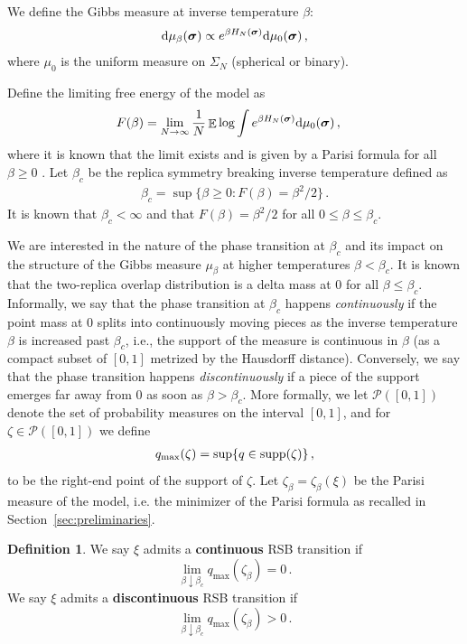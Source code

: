 \documentclass[11pt]{article}
\theoremstyle{definition}
\newtheorem{definition}{Definition}
\numberwithin{equation}{section}
\newcommand{\<}{\langle}
\renewcommand{\>}{\rangle}
\def\bsigma{{\boldsymbol{\sigma}}}
\def\bbE{{\mathbb{E}}}
\def\cP{{\mathcal{P}}}
\def\de{{\rm d}}
\DeclareMathOperator*{\E}{\bbE}
\def\supp{{\rm supp}}
\begin{document}
%
 We define the Gibbs measure at inverse temperature $\beta$:
\begin{align}\label{eq:Gibbs}
\de \mu_{\beta}(\bsigma) \propto e^{\beta H_N(\bsigma)} \de \mu_{0}(\bsigma)\,,
\end{align}
where $\mu_0$ is the uniform measure on $\Sigma_N$ (spherical or binary).

Define the limiting free energy of the model as
 \begin{align}
F(\beta) &= \lim_{N\to \infty} \frac{1}{N} \E \log \int e^{\beta H_N(\bsigma)} \de\mu_0( \bsigma)\,,
\end{align}
where it is known that the limit exists and is given by a Parisi formula for all $\beta \ge 0$ \cite{parisi1979infinite,talagrand2006parisi,talagrand2006spherical,panchenko2013parisi,chen2013aizenman}.
%
Let $\beta_c$ be the replica symmetry breaking inverse temperature defined as 
\begin{align}\label{eq:betac}
\beta_c = \sup\{\beta \ge 0 : F(\beta) = \beta^2/2\}\,.
\end{align}
It is known that $\beta_c<\infty$ and that $F(\beta)=\beta^2/2$ for all $0\leq\beta\leq\beta_c$.


We are interested in the nature of the phase transition at $\beta_c$ and its impact on the structure of the Gibbs measure $\mu_{\beta}$ at higher temperatures $\beta < \beta_c$. It is known that the two-replica overlap distribution is a delta mass at $0$ for all $\beta \le \beta_c$. Informally, we say that the phase transition at $\beta_c$ happens \emph{continuously} if the point mass at $0$ splits into continuously moving pieces as the inverse temperature $\beta$ is increased past $\beta_c$, i.e., the support of the measure is continuous in $\beta$ (as a compact subset of $[0,1]$ metrized by the Hausdorff distance). Conversely, we say that the phase transition happens \emph{discontinuously} if a piece of the support emerges far away from 0 as soon as $\beta>\beta_c$.  
More formally, we let $\cP([0,1])$ denote the set of probability measures on the interval $[0,1]$, and for $\zeta \in \cP([0,1])$ we define
\begin{align}
q_{\max}(\zeta)
=
\sup\{q\in \supp(\zeta)\}\,,
\end{align}
to be the right-end point of the support of $\zeta$.
Let $\zeta_{\beta}=\zeta_{\beta}(\xi)$ be the Parisi measure of the model, i.e. the minimizer of the Parisi formula as recalled in Section~\ref{sec:preliminaries}.


\begin{definition}
\label{def:discontinuous}
    We say $\xi$ admits a \textbf{continuous} RSB transition if 
    \[
    \lim_{\beta\downarrow \beta_c}
    q_{\max}(\zeta_{\beta})
    =
    0\, .
    \]
    We say $\xi$ admits a \textbf{discontinuous} RSB transition if
    \[
    \lim_{\beta\downarrow \beta_c}
    q_{\max}(\zeta_{\beta})
    >0\, .
    \]
\end{definition}
\end{document}
